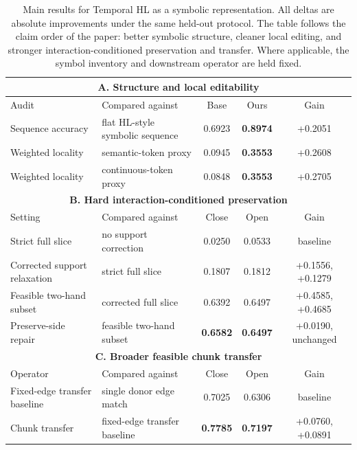 \documentclass[letterpaper]{article}
\newcommand{\thl}{Temporal HL}
\begin{document}
\begin{table}[t]
\centering
\caption{Main results for \thl{} as a symbolic representation. All deltas are
absolute improvements under the same held-out protocol. The table follows the
claim order of the paper: better symbolic structure, cleaner local editing, and
stronger interaction-conditioned preservation and transfer. Where applicable,
the symbol inventory and downstream operator are held fixed.}
\label{tab:main_results}
\small
\setlength{\tabcolsep}{6pt}
\begin{tabular}{@{}llccc@{}}
    \toprule
    \multicolumn{5}{c}{\textbf{A. Structure and local editability}} \\
    \midrule
    Audit & Compared against & Base & Ours & Gain \\
    \midrule
    Sequence accuracy & flat HL-style symbolic sequence & 0.6923 & \textbf{0.8974} & +0.2051 \\
    Weighted locality & semantic-token proxy & 0.0945 & \textbf{0.3553} & +0.2608 \\
    Weighted locality & continuous-token proxy & 0.0848 & \textbf{0.3553} & +0.2705 \\
    \midrule
    \multicolumn{5}{c}{\textbf{B. Hard interaction-conditioned preservation}} \\
    \midrule
    Setting & Compared against & Close & Open & Gain \\
    \midrule
    Strict full slice & no support correction & 0.0250 & 0.0533 & baseline \\
    Corrected support relaxation & strict full slice & 0.1807 & 0.1812 & +0.1556, +0.1279 \\
    Feasible two-hand subset & corrected full slice & 0.6392 & 0.6497 & +0.4585, +0.4685 \\
    Preserve-side repair & feasible two-hand subset & \textbf{0.6582} & \textbf{0.6497} & +0.0190, unchanged \\
    \midrule
    \multicolumn{5}{c}{\textbf{C. Broader feasible chunk transfer}} \\
    \midrule
    Operator & Compared against & Close & Open & Gain \\
    \midrule
    Fixed-edge transfer baseline & single donor edge match & 0.7025 & 0.6306 & baseline \\
    Chunk transfer & fixed-edge transfer baseline & \textbf{0.7785} & \textbf{0.7197} & +0.0760, +0.0891 \\
    \bottomrule
\end{tabular}
\end{table}
\end{document}
